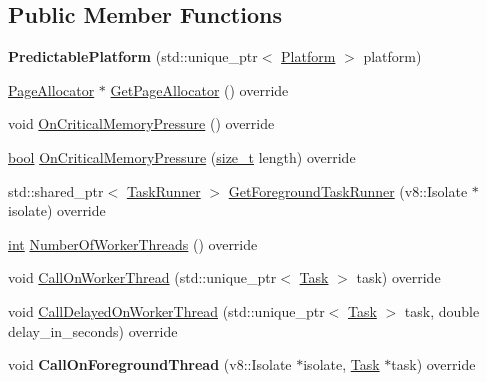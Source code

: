 \subsection*{Public Member Functions}
\begin{DoxyCompactItemize}
\item 
\mbox{\label{classv8_1_1PredictablePlatform_ae447868bb632ec22acb121ee7ee24073}} 
{\bfseries Predictable\+Platform} (std\+::unique\+\_\+ptr$<$ \mbox{\hyperlink{classv8_1_1Platform}{Platform}} $>$ platform)
\item 
\mbox{\hyperlink{classv8_1_1PageAllocator}{Page\+Allocator}} $\ast$ \mbox{\hyperlink{classv8_1_1PredictablePlatform_ac9e493b7320d723958f47c93dfd1db70}{Get\+Page\+Allocator}} () override
\item 
void \mbox{\hyperlink{classv8_1_1PredictablePlatform_abeea60c323e795787753638133ff525e}{On\+Critical\+Memory\+Pressure}} () override
\item 
\mbox{\hyperlink{classbool}{bool}} \mbox{\hyperlink{classv8_1_1PredictablePlatform_a358d24a36a74e1c9e2a9bbae6e81bff1}{On\+Critical\+Memory\+Pressure}} (\mbox{\hyperlink{classsize__t}{size\+\_\+t}} length) override
\item 
std\+::shared\+\_\+ptr$<$ \mbox{\hyperlink{classv8_1_1TaskRunner}{Task\+Runner}} $>$ \mbox{\hyperlink{classv8_1_1PredictablePlatform_adcf0ce1eba22ca032ed59098e60ce059}{Get\+Foreground\+Task\+Runner}} (v8\+::\+Isolate $\ast$isolate) override
\item 
\mbox{\hyperlink{classint}{int}} \mbox{\hyperlink{classv8_1_1PredictablePlatform_abe8bf7e862a8403649bb3548ceab61ff}{Number\+Of\+Worker\+Threads}} () override
\item 
void \mbox{\hyperlink{classv8_1_1PredictablePlatform_a9b41e6b1041c62d9ff5e76a3a7a0aa69}{Call\+On\+Worker\+Thread}} (std\+::unique\+\_\+ptr$<$ \mbox{\hyperlink{classv8_1_1Task}{Task}} $>$ task) override
\item 
void \mbox{\hyperlink{classv8_1_1PredictablePlatform_aebe343ebe283f3ffdc905282fbfeb5ad}{Call\+Delayed\+On\+Worker\+Thread}} (std\+::unique\+\_\+ptr$<$ \mbox{\hyperlink{classv8_1_1Task}{Task}} $>$ task, double delay\+\_\+in\+\_\+seconds) override
\item 
\mbox{\label{classv8_1_1PredictablePlatform_a64f76138c0fcff49858fb1aef34d31e9}} 
void {\bfseries Call\+On\+Foreground\+Thread} (v8\+::\+Isolate $\ast$isolate, \mbox{\hyperlink{classv8_1_1Task}{Task}} $\ast$task) override

\end{DoxyCompactItemize}
